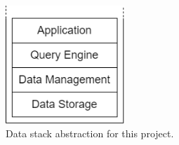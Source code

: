 \begin{figure}[!ht]
    \begin{center}
      \includegraphics[width=0.4\textwidth]{figures/2-background_and_related_work/datastack.png}
    \end{center}
    \caption[Data stack abstraction]{Data stack abstraction for this project.}
    \label{fig:datastack}
\end{figure}